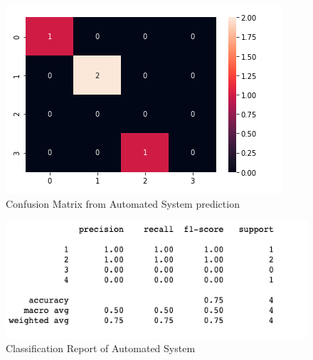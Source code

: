 \begin{figure}[!htp]
    \includegraphics[width=\textwidth]{Images/a10.png}
    \caption{Confusion Matrix from Automated System prediction}
    \label{fig:f11}
\end{figure}

\begin{figure}[!htp]
    \includegraphics[width=\textwidth]{Images/a10r.png}
    \caption{Classification Report of Automated System}
    \label{fig:f11}
\end{figure}